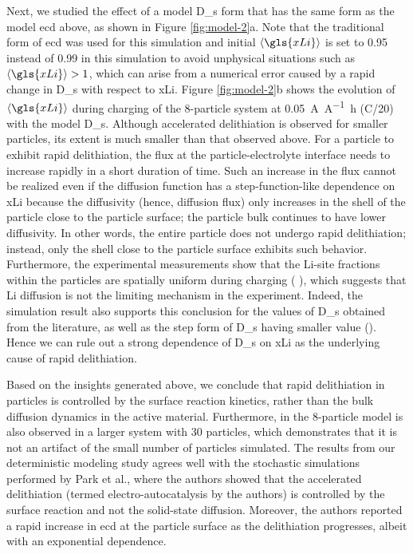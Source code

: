 \documentclass{article}
\begin{document}
Next, we studied the effect of a model \gls{D_s} form that has the
same form as the model \gls{ecd} above, as shown in Figure
\ref{fig:model-2}a. Note that the traditional form of \gls{ecd} was
used for this simulation and initial $\left\langle \gls{xLi}
\right\rangle$ is set to \num{0.95} instead of \num{0.99} in this
simulation to avoid unphysical situations such as $\left\langle
\gls{xLi} \right\rangle > 1$, which can arise from a numerical error
caused by a rapid change in \gls{D_s} with respect to
\gls{xLi}. Figure \ref{fig:model-2}b shows the evolution of
$\left\langle \gls{xLi} \right\rangle$ during charging of the
8-particle system at \SI{0.05}{\ampere\per\ampere\hour} (C/20) with
the model \gls{D_s}. Although accelerated delithiation is observed for
smaller particles, its extent is much smaller than that observed
above. For a particle to exhibit rapid delithiation, the flux at the
particle-electrolyte interface needs to increase rapidly in a short
duration of time. Such an increase in the flux cannot be realized even
if the diffusion function has a step-function-like dependence on
\gls{xLi} because the diffusivity (hence, diffusion flux) only
increases in the shell of the particle close to the particle surface;
the particle bulk continues to have lower diffusivity. In other words,
the entire particle does not undergo rapid delithiation; instead, only
the shell close to the particle surface exhibits such
behavior. Furthermore, the experimental measurements show that the
Li-site fractions within the particles are spatially uniform during
charging ( ), which
suggests that Li diffusion is not the limiting mechanism in the
experiment. Indeed, the simulation result also supports this
conclusion for the values of \gls{D_s} obtained from the literature,
as well as the step form of \gls{D_s} having  smaller value
(). Hence we can rule out
a strong dependence of \gls{D_s} on \gls{xLi} as the underlying cause
of rapid delithiation.

Based on the insights generated above, we conclude that rapid
delithiation in \nca{} particles is controlled by the surface reaction
kinetics, rather than the bulk  diffusion dynamics in the
active material. Furthermore,  in the 8-particle model is also observed in a larger
system with 30 particles, which demonstrates that it is not an
artifact of the small number of particles simulated. The results from
our deterministic modeling study agrees well with the stochastic
simulations performed by Park et al.\cite{chueh2021}, where the
authors showed that the accelerated delithiation (termed
electro-autocatalysis by the authors) is controlled by the surface
reaction and not the solid-state diffusion. Moreover, the authors
reported a rapid increase in \gls{ecd} at the \nca{} particle surface
as the delithiation progresses, albeit with an exponential dependence. 
\end{document}
